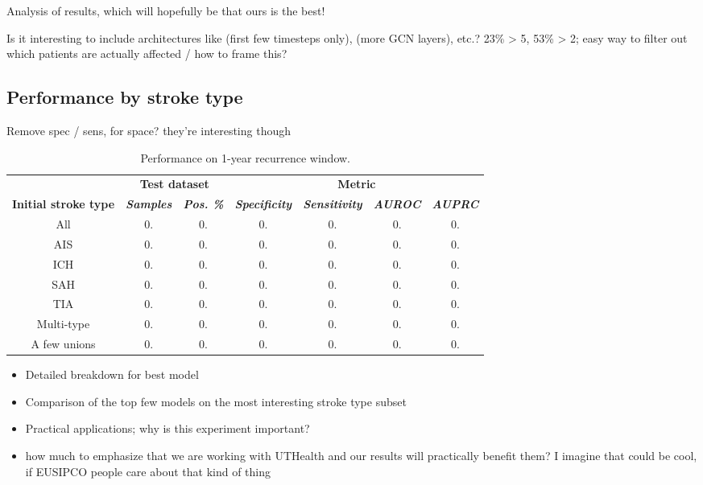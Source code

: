 \documentclass[conference]{IEEEtran}
\begin{document}
Analysis of results, which will hopefully be that ours is the best!

{\color{red} Is it interesting to include architectures like (first few timesteps only), (more GCN layers), etc.?}
{\color{red} 23\% > 5, 53\% > 2; easy way to filter out which patients are actually affected / how to frame this?}

\subsection{Performance by stroke type}

{\color{red}Remove spec / sens, for space? they're interesting though}
\begin{table}[htbp]
    \caption{Performance on 1-year recurrence window.}
    \begin{center}
    \begin{tabular}{|c|c|c|c|c|c|c|}
    \hline
    &\multicolumn{2}{|c|}{\textbf{Test dataset}}&\multicolumn{4}{|c|}{\textbf{Metric}} \\
    \cline{2-7} 
    \textbf{Initial stroke type} & \textbf{\textit{Samples}}& \textbf{\textit{Pos. \%}}& \textbf{\textit{Specificity}}& \textbf{\textit{Sensitivity}}& \textbf{\textit{AUROC}} &\textbf{\textit{AUPRC}}\\
    \hline
    All& 0. & 0. & 0. & 0. & 0. & 0. \\
    \hline
    AIS& 0. & 0. & 0. & 0. & 0. & 0. \\
    \hline
    ICH& 0. & 0. & 0. & 0. & 0. & 0. \\
    \hline
    SAH& 0. & 0. & 0. & 0. & 0. & 0. \\
    \hline
    TIA& 0. & 0. & 0. & 0. & 0. & 0. \\
    \hline
    Multi-type& 0. & 0. & 0. & 0. & 0. & 0. \\
    \hline
    A few unions& 0. & 0. & 0. & 0. & 0. & 0. \\
    \hline
    \end{tabular}
    \label{tab1}
    \end{center}
    \end{table}


\begin{itemize}
    \item Detailed breakdown for best model
    \item Comparison of the top few models on the most interesting stroke type subset
    \item Practical applications; why is this experiment important?
    \item {\color{red} how much to emphasize that we are working with UTHealth and our results will practically benefit them? I imagine that could be cool, if EUSIPCO people care about that kind of thing}
\end{itemize}
\end{document}
